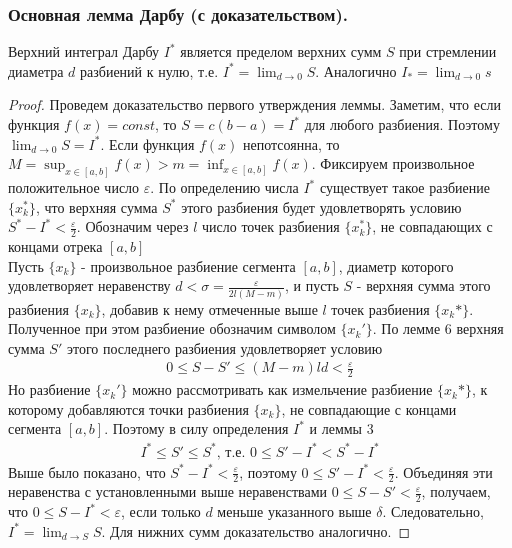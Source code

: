 \documentclass[10pt]{article}
\begin{document}
    
    \subsubsection{Основная лемма Дарбу (с доказательством).}
    \begin{lemma}
        Верхний интеграл Дарбу $I^*$ является пределом верхних сумм $S$ при стремлении диаметра $d$ разбиений к нулю, т.е. $I^*=\lim_{d \to 0} S$. Аналогично $I_*=\lim_{d \to 0} s$
    \end{lemma}
    \begin{proof}
        Проведем доказательство первого утверждения леммы. Заметим, что если функция $f(x) = const$, то $S=c(b-a)=I^*$ для любого разбиения. Поэтому $\lim_{d \to 0} S = I^*$. Если функция $f(x)$ непотсоянна, то $M=\sup_{x \in [a, b]}f(x) > m = \inf_{x \in [a, b]}f(x)$. Фиксируем произвольное положительное число $\varepsilon$. По определению числа $I^*$ существует такое разбиение $\{x_k^*\}$, что верхняя сумма $S^*$ этого разбиения будет удовлетворять условию $S^* - I^* < \frac{\varepsilon}{2}$. Обозначим через $l$ число точек разбиения $\{x_k^*\}$, не совпадающих с концами отрека $[a, b]$\\
        Пусть $\{x_k\}$ - произвольное разбиение сегмента $[a, b]$, диаметр которого удовлетворяет неравенству $d < \sigma = \frac{\varepsilon}{2l(M-m)}$, и пусть $S$ - верхняя сумма этого разбиения $\{x_k\}$, добавив к нему отмеченные выше $l$ точек разбиения $\{x_k*\}$. Полученное при этом разбиение обозначим символом $\{x_k'\}$. По лемме $6$ верхняя сумма $S'$ этого последнего разбиения удовлетворяет условию
        \begin{gather*}
            0 \leq S - S' \leq (M-m)ld < \frac{\varepsilon}{2}
        \end{gather*}
        Но разбиение $\{x_k'\}$ можно рассмотривать как измельчение разбиение $\{x_k*\}$, к которому добавляются точки разбиения $\{x_k\}$, не совпадающие с концами сегмента $[a, b]$. Поэтому в силу определения $I^*$ и леммы 3
        \begin{gather*}
            I^* \leq S' \leq S^* \text{, т.е. } 0 \leq S' - I^* < S^* - I^*
        \end{gather*}
        Выше было показано, что $S^* - I^* < \frac{\varepsilon}{2}$, поэтому $0 \leq S' - I^* < \frac{\varepsilon}{2}$. Объединяя эти неравенства с установленными выше неравенствами $0 \leq S - S' < \frac{\varepsilon}{2}$, получаем, что $0 \leq S - I^* < \varepsilon$, если только $d$ меньше указанного выше $\delta$. Следовательно, $I^* = \lim_{d \to S} S$. Для нижних сумм доказательство аналогично.
    \end{proof}
\end{document}

